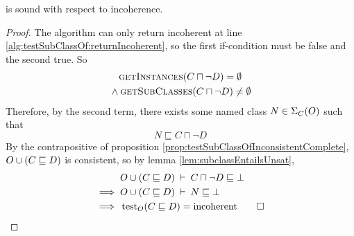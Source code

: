 \documentclass[paper.tex]{subfiles}
\begin{document}
\begin{proposition}
  \label{prop:testSubClassOfIncoherentSound}
   is sound with respect to incoherence.
\end{proposition}
\begin{proof}
  The algorithm can only return incoherent at line \ref{alg:testSubClassOf:returnIncoherent}, so the first if-condition must be false and the second true.  So
  \begin{multline*}
    \Call{getInstances}{C \sqcap \neg D} = \emptyset \\
    {} \land \Call{getSubClasses}{C \sqcap \neg D} \ne \emptyset
  \end{multline*}
  Therefore, by the second term, there exists some named class $N \in \Sigma_C(O)$ such that
  \[ N \sqsubseteq C \sqcap \neg D \]
  By the contrapositive of proposition \ref{prop:testSubClassOfInconsistentComplete}, $O \cup (C \sqsubseteq D)$ is consistent, so by lemma \ref{lem:subclassEntailsUnsat},
  \begin{align*}
    & O \cup (C \sqsubseteq D) \:\vdash\: C \sqcap \neg D \sqsubseteq \bot \\
    \implies{}& O \cup (C \sqsubseteq D) \:\vdash\: N \sqsubseteq \bot \\
    \implies{}& \operatorname{test}_O(C \sqsubseteq D) = \mathrm{incoherent}
    \qed
  \end{align*}
\end{proof}
\end{document}

